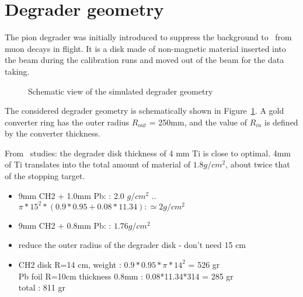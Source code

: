 \section{Degrader geometry}

The pion degrader was initially introduced to suppress the background to \piplusenu\
from muon decays in flight. It is a disk made of non-magnetic material inserted
into the beam during the calibration runs and moved out of the beam for the data taking.

\begin{figure}[H]
  \caption{
    \label{figure:degrader_geometry_001}
    Schematic view of the simulated degrader geometry
  }
\end{figure}

The considered degrader geometry is schematically shown in Figure~\ref{figure:degrader_geometry_001}.
A gold converter ring has the outer radius $R_{out}$ = 250mm, and the value of $R_{in}$ is defined
by the converter thickness.

From \piplusenu\ studies: the degrader disk thickness of 4 mm Ti is close to optimal.
4mm of Ti translates into the total amount of material of $1.8 g/cm^2$, about twice that
of the stopping target.
\begin{itemize}
\item
  9mm CH2 + 1.0mm Pb: : 2.0 $g/cm^2$   .. $\pi*15^2*(0.9*0.95 + 0.08*11.34): \simeq 2 g/cm^2$
\item
   9mm CH2 + 0.8mm Pb: : $1.76 g/cm^2$
 \item
   reduce the outer radius of the degrader disk - don't need 15 cm
 \item
   CH2 disk R=14 cm, weight        : $0.9*0.95*\pi*14^2$ = 526 gr \\
   Pb  foil R=10cm thickness 0.8mm : 0.08*11.34*314    = 285 gr \\
   total                           : 811 gr
\end{itemize}

